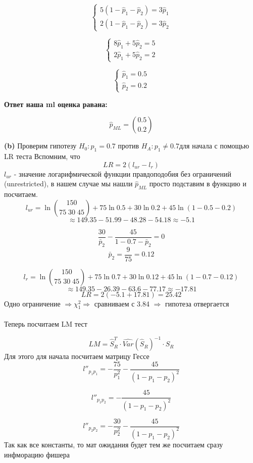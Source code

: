 \documentclass[a4paper, 12pt]{article} %
\begin{document}
\[\left\{
    \begin{gathered}
    5(1 - \hat p_1 - \hat p_2) = 3\hat p_1 \\
    2(1 - \hat p_1 - \hat p_2) = 3\hat p_2
\end{gathered} \right.
\]

\[\left\{
    \begin{gathered}
     8\hat p_1 + 5 \hat p_2 = 5 \\
    2\hat p_1 + 5\hat p_2 = 2
\end{gathered} \right.
\]

\[\left\{
    \begin{gathered}
     \hat p_1 = 0.5 \\
    \hat p_2 = 0.2
\end{gathered} \right.
\]

\textbf{Ответ наша ml оценка равана:}

\[
    \hat p_{ML} = \binom{0.5}{0.2}
\]

\textbf{(b)}
Проверим гипотезу $H_0: p_1 = 0.7$ против $H_A: p_1 \neq 0.7$для начала с помощью LR теста
Вспомним, что
\[
    LR = 2(l_{ur} - l_r)
\]
$l_{ur}$ - значение логарифмической функции правдоподобия без ограничений (unrestricted), в нашем
случае мы нашли $\hat p_{ML}$ просто подставим в функцию и посчитаем.
\[ 
    l_{ur} = 
    \ln\binom{150}{75\; 30\; 45} + 75 \ln 0.5 + 30\ln 0.2 + 45\ln(1 - 0.5 - 0.2) 
\]
\[
    \approx 149.35 - 51.99 - 48.28 - 54.18 \approx -5.1    
\]

\[
    \frac{30}{\bar p_2} - \frac{45}{1- 0.7 - \bar p_2} = 0
\]
\[
    \bar p_2 = \frac{9}{75} = 0.12
\]

\[
    l_{r} = \ln\binom{150}{75\; 30\; 45} + 75 \ln 0.7 + 30\ln 0.12 + 45\ln(1 - 0.7 - 0.12)
\]
\[
    \approx 149.35 - 26.39 - 63.6 - 77.17 \approx -17.81
\]
\[
LR = 2(-5.1 + 17.81) = 25.42
\]
Одно ограничение $\Rightarrow \chi^2_1 \Rightarrow$ 
сравниваем с 3.84 $\Rightarrow$ гипотеза отвергается \\\\
Теперь посчитаем LM тест

\[
LM = \hat S^T_R \cdot \widehat{Var}(\hat S_R)^{-1} \cdot \hat S_R   
\]
Для этого для начала посчитаем матрицу Гессе
\[
    l''_{p_1p_1} = -\frac{75}{p_1^2} - \frac{45}{(1- p_1 - p_2)^2}
\]

\[
    l''_{p_1p_2} = - \frac{45}{(1- p_1 - p_2)^2}
\]

\[
    l''_{p_2p_2} = -\frac{30}{p_2^2} - \frac{45}{(1- p_1 - p_2)^2}
\]
Так как все константы, то мат ожидания будет тем же посчитаем сразу инфморацию фишера
\end{document}
